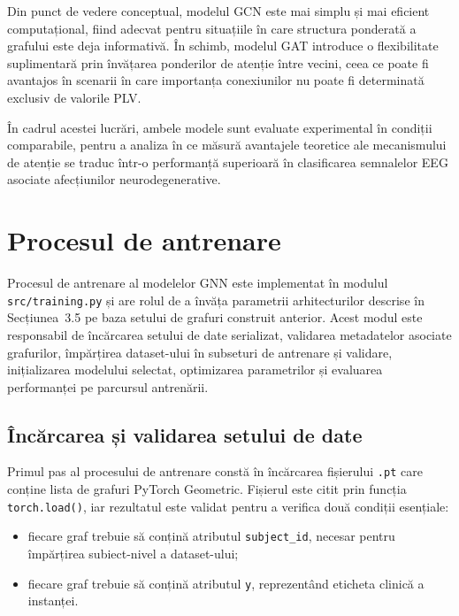\documentclass[12pt,a4paper]{report}
\theoremstyle{definition}
\theoremstyle{remark}
\begin{document}
Din punct de vedere conceptual, modelul GCN este mai simplu și mai eficient computațional, fiind adecvat pentru situațiile în care structura ponderată a grafului este deja informativă. În schimb, modelul GAT introduce o flexibilitate suplimentară prin învățarea ponderilor de atenție între vecini, ceea ce poate fi avantajos în scenarii în care importanța conexiunilor nu poate fi determinată exclusiv de valorile PLV.

În cadrul acestei lucrări, ambele modele sunt evaluate experimental în condiții comparabile, pentru a analiza în ce măsură avantajele teoretice ale mecanismului de atenție se traduc într-o performanță superioară în clasificarea semnalelor EEG asociate afecțiunilor neurodegenerative.

\section{Procesul de antrenare}

Procesul de antrenare al modelelor GNN este implementat în modulul \texttt{src/training.py} și are rolul de a învăța parametrii arhitecturilor descrise în Secțiunea~3.5 pe baza setului de grafuri construit anterior. Acest modul este responsabil de încărcarea setului de date serializat, validarea metadatelor asociate grafurilor, împărțirea dataset-ului în subseturi de antrenare și validare, inițializarea modelului selectat, optimizarea parametrilor și evaluarea performanței pe parcursul antrenării.

\subsection{Încărcarea și validarea setului de date}

Primul pas al procesului de antrenare constă în încărcarea fișierului \texttt{.pt} care conține lista de grafuri PyTorch Geometric. Fișierul este citit prin funcția \texttt{torch.load()}, iar rezultatul este validat pentru a verifica două condiții esențiale:
\begin{itemize}
    \item fiecare graf trebuie să conțină atributul \texttt{subject\_id}, necesar pentru împărțirea subiect-nivel a dataset-ului;
    \item fiecare graf trebuie să conțină atributul \texttt{y}, reprezentând eticheta clinică a instanței.
\end{itemize}
\end{document}
